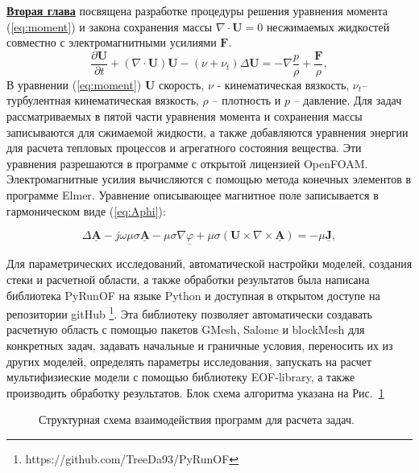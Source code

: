 \underline{\textbf{Вторая глава}} посвящена разработке процедуры решения уравнения момента (\ref{eq:moment}) и закона сохранения массы $ \nabla \cdot \mathbf{U} = 0$ несжимаемых жидкостей совместно с электромагнитными усилиями $\mathbf{F}$.
\begin{equation}
	\frac{\partial\mathbf{U}}{\partial t} +\left( \nabla \cdot \mathbf{U} \right) \mathbf{U} - \left( \nu + \nu_t \right) \Delta \mathbf{U} = -\nabla \frac{p}{\rho} + \frac{\mathbf{F}}{\rho},
	\label{eq:moment}
\end{equation}
В уравнении (\ref{eq:moment}) $\mathbf{U}$ скорость, $\nu$ - кинематическая вязкость, $\nu_{t}$-- турбулентная кинематическая вязкость, $\rho$ -- плотность и $p$ -- давление. 
Для задач рассматриваемых в пятой части уравнения момента и сохранения массы записываются для сжимаемой жидкости, а также добавляются уравнения энергии для расчета тепловых процессов и агрегатного состояния вещества. Эти уравнения разрешаются в программе с открытой лицензией OpenFOAM. Электромагнитные усилия вычисляются с помощью метода конечных элементов в программе Elmer. Уравнение описывающее магнитное поле записывается в гармоническом виде (\ref{eq:Aphi}):

\begin{equation}
	\Delta \mathbf{\underline{A}}-j\omega \mu \sigma \mathbf{\underline{A}}-\mu \sigma \nabla \underline{\varphi}+\mu \sigma (\mathbf{U}\times \nabla \times \mathbf{\underline{A}})=-\mu \mathbf{\underline{J}},	
	\label{eq:Aphi}
\end{equation}

Для параметрических исследований, автоматической настройки моделей, создания стеки и расчетной области, а также обработки результатов была написана библиотека PyRunOF на языке  Python и доступная в открытом доступе на репозитории gitHub \footnote{https://github.com/TreeDa93/PyRunOF}. Эта библиотеку позволяет автоматически создавать расчетную область с помощью пакетов GMesh, Salome и blockMesh для конкретных задач, задавать начальные и граничные условия, переносить их из других моделей, определять параметры исследования, запускать на расчет мультифизиеские модели с помощью библиотеку EOF-library, а также производить обработку результатов. Блок схема алгоритма указана на Рис.~\ref{fig:solver}

\begin{figure}[h]
	\caption{Структурная схема взаимодействия программ для расчета задач.}
	\label{fig:solver}
\end{figure}

